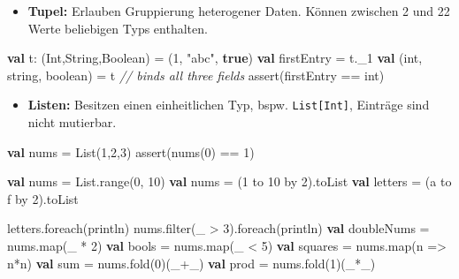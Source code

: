 \documentclass[]{article}
\newenvironment{Shaded}{}{}
\newcommand{\CharTok}[1]{\textcolor[rgb]{0.25,0.44,0.63}{#1}}
\newcommand{\CommentTok}[1]{\textcolor[rgb]{0.38,0.63,0.69}{\textit{#1}}}
\newcommand{\DataTypeTok}[1]{\textcolor[rgb]{0.56,0.13,0.00}{#1}}
\newcommand{\DecValTok}[1]{\textcolor[rgb]{0.25,0.63,0.44}{#1}}
\newcommand{\FunctionTok}[1]{\textcolor[rgb]{0.02,0.16,0.49}{#1}}
\newcommand{\KeywordTok}[1]{\textcolor[rgb]{0.00,0.44,0.13}{\textbf{#1}}}
\newcommand{\NormalTok}[1]{#1}
\newcommand{\StringTok}[1]{\textcolor[rgb]{0.25,0.44,0.63}{#1}}
\providecommand{\tightlist}{%
  \setlength{\itemsep}{0pt}\setlength{\parskip}{0pt}}
\begin{document}
\begin{itemize}
\tightlist
\item
  \textbf{Tupel:} Erlauben Gruppierung heterogener Daten. Können
  zwischen 2 und 22 Werte beliebigen Typs enthalten.
\end{itemize}

\begin{Shaded}
\begin{Highlighting}[]
\KeywordTok{val}\NormalTok{ t: (Int,String,Boolean) = (}\DecValTok{1}\NormalTok{, }\StringTok{"abc"}\NormalTok{, }\KeywordTok{true}\NormalTok{)}
\KeywordTok{val}\NormalTok{ firstEntry = t.}\FunctionTok{\_1}
\KeywordTok{val}\NormalTok{ (}\DataTypeTok{int}\NormalTok{, string, }\DataTypeTok{boolean}\NormalTok{) = t }\CommentTok{// binds all three fields}
\FunctionTok{assert}\NormalTok{(firstEntry == }\DataTypeTok{int}\NormalTok{)}
\end{Highlighting}
\end{Shaded}

\begin{itemize}
\tightlist
\item
  \textbf{Listen:} Besitzen einen einheitlichen Typ, bspw.
  \texttt{List{[}Int{]}}, Einträge sind nicht mutierbar.
\end{itemize}

\begin{Shaded}
\begin{Highlighting}[]
\KeywordTok{val}\NormalTok{ nums = List(}\DecValTok{1}\NormalTok{,}\DecValTok{2}\NormalTok{,}\DecValTok{3}\NormalTok{)}
\FunctionTok{assert}\NormalTok{(}\FunctionTok{nums}\NormalTok{(}\DecValTok{0}\NormalTok{) == }\DecValTok{1}\NormalTok{)}

\KeywordTok{val}\NormalTok{ nums = List.}\FunctionTok{range}\NormalTok{(}\DecValTok{0}\NormalTok{, }\DecValTok{10}\NormalTok{)}
\KeywordTok{val}\NormalTok{ nums = (}\DecValTok{1}\NormalTok{ to }\DecValTok{10}\NormalTok{ by }\DecValTok{2}\NormalTok{).}\FunctionTok{toList}
\KeywordTok{val}\NormalTok{ letters = (}\CharTok{\textquotesingle{}a\textquotesingle{}}\NormalTok{ to }\CharTok{\textquotesingle{}f\textquotesingle{}}\NormalTok{ by }\DecValTok{2}\NormalTok{).}\FunctionTok{toList}

\NormalTok{letters.}\FunctionTok{foreach}\NormalTok{(println)}
\NormalTok{nums.}\FunctionTok{filter}\NormalTok{(\_ \textgreater{} }\DecValTok{3}\NormalTok{).}\FunctionTok{foreach}\NormalTok{(println)}
\KeywordTok{val}\NormalTok{ doubleNums = nums.}\FunctionTok{map}\NormalTok{(\_ * }\DecValTok{2}\NormalTok{) }
\KeywordTok{val}\NormalTok{ bools = nums.}\FunctionTok{map}\NormalTok{(\_ \textless{} }\DecValTok{5}\NormalTok{)}
\KeywordTok{val}\NormalTok{ squares = nums.}\FunctionTok{map}\NormalTok{(n =\textgreater{} n*n)}
\KeywordTok{val}\NormalTok{ sum = nums.}\FunctionTok{fold}\NormalTok{(}\DecValTok{0}\NormalTok{)(\_+\_)}
\KeywordTok{val}\NormalTok{ prod = nums.}\FunctionTok{fold}\NormalTok{(}\DecValTok{1}\NormalTok{)(\_*\_)}
\end{Highlighting}
\end{Shaded}
\end{document}

